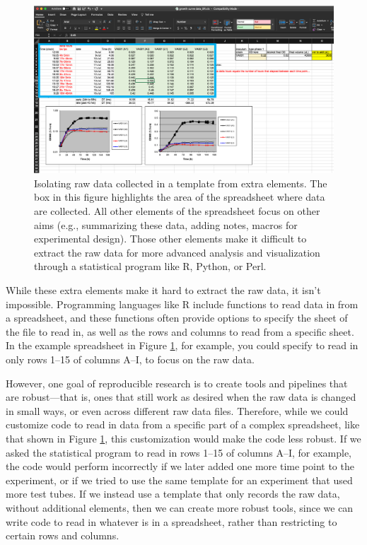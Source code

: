 \documentclass[]{tufte-book}
\begin{document}
\begin{figure}
\includegraphics[width=\textwidth]{figures/growth_curve_raw_data} \caption[Isolating raw data collected in a template from extra elements]{Isolating raw data collected in a template from extra elements. The box in this figure highlights the area of the spreadsheet where data are collected. All other elements of the spreadsheet focus on other aims (e.g., summarizing these data, adding notes, macros for experimental design). Those other elements make it difficult to extract the raw data for more advanced analysis and visualization through a statistical program like R, Python, or Perl.}\label{fig:extractraw}
\end{figure}

While these extra elements make it hard to extract the raw data, it isn't
impossible. Programming languages like R include functions to read data in from
a spreadsheet, and these functions often provide options to specify the sheet of
the file to read in, as well as the rows and columns to read from a specific
sheet. In the example spreadsheet in Figure \ref{fig:extractraw}, for example,
you could specify to read in only rows 1--15 of columns A--I, to focus on the
raw data.

However, one goal of reproducible research is to create tools and pipelines that
are robust---that is, ones that still work as desired when the raw data is
changed in small ways, or even across different raw data files. Therefore, while
we could customize code to read in data from a specific part of a complex
spreadsheet, like that shown in Figure \ref{fig:extractraw}, this customization
would make the code less robust. If we asked the statistical program to read in
rows 1--15 of columns A--I, for example, the code would perform incorrectly if
we later added one more time point to the experiment, or if we tried to use the
same template for an experiment that used more test tubes. If we instead use a
template that only records the raw data, without additional elements, then we
can create more robust tools, since we can write code to read in whatever is in
a spreadsheet, rather than restricting to certain rows and columns.
\end{document}
